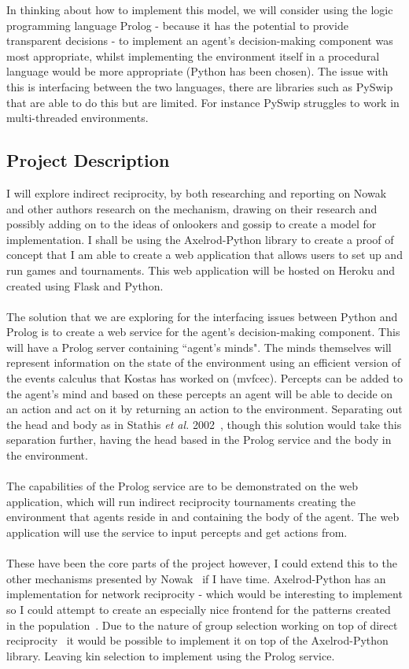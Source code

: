 \documentclass{article}
\begin{document}
In thinking about how to implement this model, we will consider using the logic programming language Prolog  - because it has the potential to provide transparent decisions - to implement an agent's decision-making component was most appropriate, whilst implementing the environment itself in a procedural language would be more appropriate (Python has been chosen). The issue with this is interfacing between the two languages, there are libraries such as PySwip~\cite{pyswip} that are able to do this but are limited. For instance PySwip struggles to work in multi-threaded environments.

\subsection*{Project Description}
I will explore indirect reciprocity, by both researching and reporting on Nowak and other authors research on the mechanism, drawing on their research and possibly adding on to the ideas of onlookers and gossip to create a model for implementation. I shall be using the Axelrod-Python library to create a proof of concept that I am able to create a web application that allows users to set up and run games and tournaments. This web application will be hosted on Heroku and created using Flask and Python.\\\\
The solution that we are exploring for the interfacing issues between Python and Prolog is to create a web service for the agent's decision-making component. This will have a Prolog server containing ``agent's minds". The minds themselves will represent information on the state of the environment using an efficient version of the events calculus that Kostas has worked on (mvfcec). Percepts can be added to the agent's mind and based on these percepts an agent will be able to decide on an action and act on it by returning an action to the environment. Separating out the head and body as in Stathis \textit{et al.} 2002~\cite{prosocs}, though this solution would take this separation further, having the head based in the Prolog service and the body in the environment.\\\\
The capabilities of the Prolog service are to be demonstrated on the web application, which will run indirect reciprocity tournaments creating the environment that agents reside in and containing the body of the agent. The web application will use the service to input percepts and get actions from.\\\\
These have been the core parts of the project however, I could extend this to the other mechanisms presented by Nowak~\cite{five_rules_coop} if I have time. Axelrod-Python has an implementation for network reciprocity - which would be interesting to implement so I could attempt to create an especially nice frontend for the patterns created in the population~\cite{spatial}. Due to the nature of group selection working on top of direct reciprocity~\cite{multilevel_nowak} it would be possible to implement it on top of the Axelrod-Python library. Leaving kin selection to implement using the Prolog service.
\end{document}
